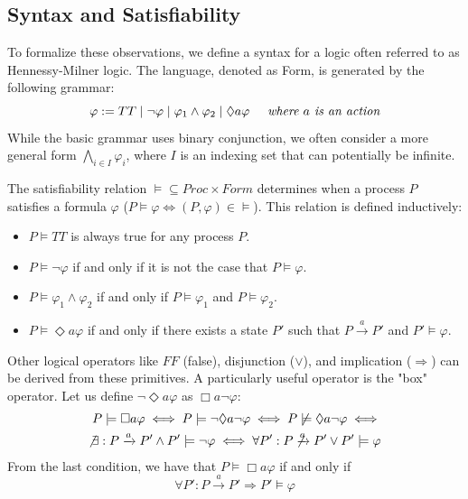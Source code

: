 \subsection{Syntax and Satisfiability}
To formalize these observations, we define a syntax for a logic often referred to as Hennessy-Milner logic. The language, denoted as Form, is generated by the following grammar:
\begin{equation*}
    \varphi := TT \mid \neg\varphi \mid \varphi_1 \wedge \varphi_2 \mid \Diamond a \varphi \hspace{0.5cm}\textit{where }a\textit{ is an action}
\end{equation*}
While the basic grammar uses binary conjunction, we often consider a more general form $\bigwedge_{i \in I} \varphi_i$, where $I$ is an indexing set that can potentially be infinite.

The satisfiability relation $\models \subseteq Proc \times Form$ determines when a process $P$ satisfies a formula $\varphi$ ($P\models\varphi \iff (P, \varphi)\in\models$). This relation is defined inductively: 
\begin{itemize}
    \item $P \models TT$ is always true for any process $P$.  
    \item $P \models \neg\varphi$ if and only if it is not the case that $P \models \varphi$.  
    \item $P \models \varphi_1 \wedge \varphi_2$ if and only if $P \models \varphi_1$ and $P \models \varphi_2$.  
    \item $P \models \Diamond a \varphi$ if and only if there exists a state $P'$ such that $P \xrightarrow{a} P'$ and $P' \models \varphi$.  
\end{itemize}

Other logical operators like $FF$ (false), disjunction ($\vee$), and implication ($\Rightarrow$) can be derived from these primitives. A particularly useful operator is the "box" operator. Let us define $\lnot\Diamond a\varphi$ as $\Box a\lnot \varphi$:
\begin{align*}
    P\models \Box a\varphi \iff P\models\lnot\Diamond a\lnot\varphi \iff P\not\models\Diamond a\lnot\varphi \iff\\
    \not\exists:P\xrightarrow{a}P'\land P'\models\lnot\varphi\iff \forall P':P\not\xrightarrow{a}P'\lor P'\models \varphi
\end{align*}
From the last condition, we have that $P\models\Box a \varphi$ if and only if
\begin{equation*}
    \forall P':P\xrightarrow{a}P'\Rightarrow P'\models\varphi
\end{equation*}

